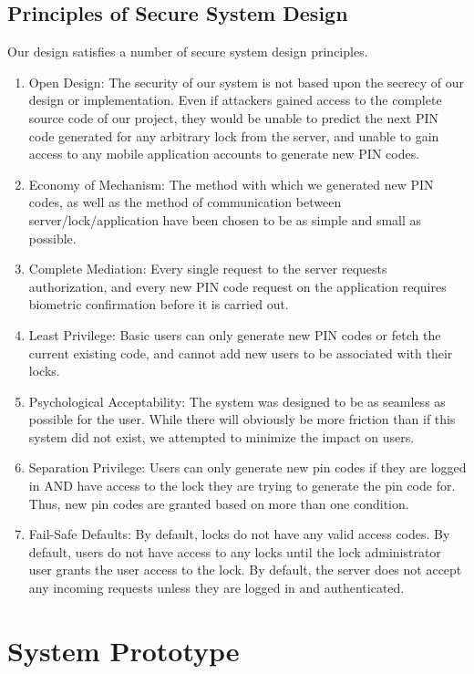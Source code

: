 \documentclass[conference]{IEEEtran}
\begin{document}
\subsection{Principles of Secure System Design}
Our design satisfies a number of secure system design principles.
\begin{enumerate}
\item{Open Design: The security of our system is not based upon the secrecy of our design or implementation. Even if attackers gained access to the complete source code of our project, they would be unable to predict the next PIN code generated for any arbitrary lock from the server, and unable to gain access to any mobile application accounts to generate new PIN codes.}
\item{
Economy of Mechanism: The method with which we generated new PIN codes, as well as the method of communication between server/lock/application have been chosen to be as simple and small as possible.
}
\item{
Complete Mediation: Every single request to the server requests authorization, and every new PIN code request on the application requires biometric confirmation before it is carried out.
}
\item{
Least Privilege: Basic users can only generate new PIN codes or fetch the current existing code, and cannot add new users to be associated with their locks.
}
\item{
Psychological Acceptability: The system was designed to be as seamless as possible for the user. While there will obviously be more friction than if this system did not exist, we attempted to minimize the impact on users.
}
\item{
Separation Privilege: Users can only generate new pin codes if they are logged in AND have access to the lock they are trying to generate the pin code for. Thus, new pin codes are granted based on more than one condition.
}
\item{
Fail-Safe Defaults: By default, locks do not have any valid access codes. By default, users do not have access to any locks until the lock administrator user grants the user access to the lock. By default, the server does not accept any incoming requests unless they are logged in and authenticated.
}
\end{enumerate}


\section{System Prototype}
\end{document}
